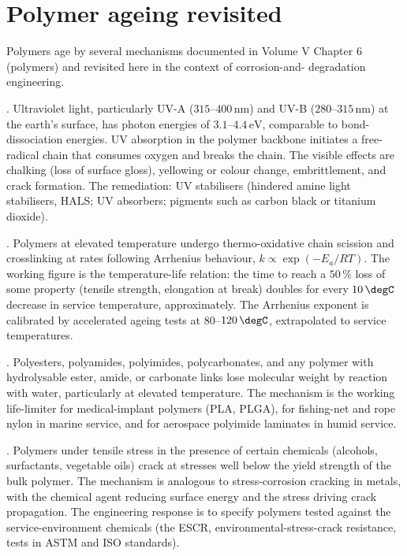 \section{Polymer ageing revisited}

Polymers age by several mechanisms documented in Volume V Chapter 6
(polymers) and revisited here in the context of corrosion-and-
degradation engineering.

. Ultraviolet light, particularly UV-A
($315$--$400\,\text{nm}$) and UV-B ($280$--$315\,\text{nm}$) at the
earth's surface, has photon energies of $3.1$--$4.4\,\text{eV}$,
comparable to bond-dissociation energies. UV absorption in the polymer
backbone initiates a free-radical chain that consumes oxygen and
breaks the chain. The visible effects are chalking (loss of surface
gloss), yellowing or colour change, embrittlement, and crack
formation. The remediation: UV stabilisers (hindered amine light
stabilisers, HALS; UV absorbers; pigments such as carbon black or
titanium dioxide).

. Polymers at elevated temperature undergo
thermo-oxidative chain scission and crosslinking at rates following
Arrhenius behaviour, $k \propto \exp(-E_a/RT)$. The working figure is
the temperature-life relation: the time to reach a $50\,\%$ loss of
some property (tensile strength, elongation at break) doubles for
every $10\,\degC$ decrease in service temperature, approximately. The
Arrhenius exponent is calibrated by accelerated ageing tests at
$80$--$120\,\degC$, extrapolated to service temperatures.

. Polyesters, polyamides, polyimides,
polycarbonates, and any polymer with hydrolysable ester, amide, or
carbonate links lose molecular weight by reaction with water,
particularly at elevated temperature. The mechanism is the working
life-limiter for medical-implant polymers (PLA, PLGA), for fishing-net
and rope nylon in marine service, and for aerospace polyimide laminates
in humid service.

. Polymers under tensile stress
in the presence of certain chemicals (alcohols, surfactants, vegetable
oils) crack at stresses well below the yield strength of the bulk
polymer. The mechanism is analogous to stress-corrosion cracking in
metals, with the chemical agent reducing surface energy and the stress
driving crack propagation. The engineering response is to specify
polymers tested against the service-environment chemicals (the ESCR,
environmental-stress-crack resistance, tests in ASTM and ISO
standards).

